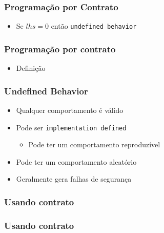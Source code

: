 \documentclass[14pt]{beamer}
\begin{document}
\frame
{
  \frametitle{Programação por Contrato}

  \usebox{\listingboxe}

  \begin{itemize}
  \item Se $lhs = 0$ então \texttt{undefined behavior}
  \end{itemize}
}

\frame
{
  \frametitle{Programação por contrato}

  \begin{itemize}
  \item Definição
  \end{itemize}
}

\frame
{
  \frametitle{Undefined Behavior}

  \begin{itemize}
  \item \alert<1>{Qualquer} comportamento é válido
  \item<2-> Pode ser \texttt{implementation defined}
    \begin{itemize}
    \item<3-> Pode ter um comportamento reproduzível
    \end{itemize}
  \item<4-> Pode ter um comportamento aleatório
  \item<5-> Geralmente gera falhas de segurança
  \end{itemize}
}

\newsavebox{\listingboxf}
\begin{lrbox}{\listingboxf}

\end{lrbox}

\frame
{
  \frametitle{Usando contrato}

  \usebox{\listingboxf}
}

\newsavebox{\listingboxg}
\begin{lrbox}{\listingboxg}

\end{lrbox}

\frame
{
  \frametitle{Usando contrato}

  \usebox{\listingboxg}
}

\newsavebox{\listingboxh}
\begin{lrbox}{\listingboxh}

\end{lrbox}
\end{document}

